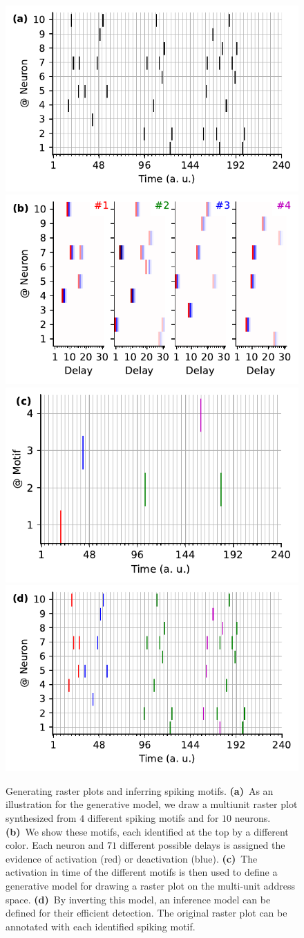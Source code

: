 \documentclass[runningheads]{llncs}
\begin{document}
\begin{figure}[t]%
  \includegraphics[width=.50\linewidth]{figures/THC_toy-a_k.pdf}
  \includegraphics[width=.50\linewidth]{figures/THC_toy-b.pdf}\\
  \includegraphics[width=.50\linewidth]{figures/THC_toy-c.pdf}
  \includegraphics[width=.50\linewidth]{figures/THC_toy-a.pdf} 

\caption{Generating raster plots and inferring spiking motifs. \textbf{(a)}~As an illustration for the generative model, we draw a multiunit raster plot synthesized from $4$ different spiking motifs and for $10$ neurons. \textbf{(b)}~We show these motifs, each identified at the top by a different color. Each neuron and $71$ different possible delays is assigned the evidence of activation (red) or deactivation (blue). \textbf{(c)}~The activation in time of the different motifs is then used to define a generative model for drawing a raster plot on the multi-unit address space. \textbf{(d)}~By inverting this model, an inference model can be defined for their efficient detection. The original raster plot can be annotated with each identified spiking motif.
}
\label{fig:THC}
\end{figure}
\end{document}
